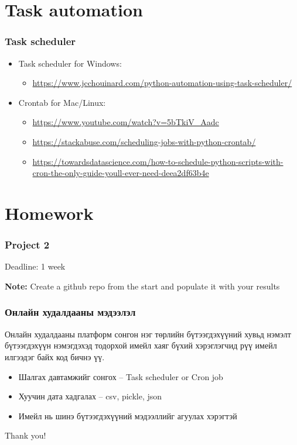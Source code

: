 \documentclass{beamer}
\begin{document}
\section{Task automation} 

\begin{frame}
    \frametitle{Task scheduler}
        \begin{itemize}
            \item Task scheduler for Windows:
            \begin{itemize}
                \item \url{https://www.jcchouinard.com/python-automation-using-task-scheduler/}
            \end{itemize}
            
            
            \item Crontab for Mac/Linux:
            \begin{itemize}
                \item \url{https://www.youtube.com/watch?v=5bTkiV_Aadc}
                \item \url{https://stackabuse.com/scheduling-jobs-with-python-crontab/}
                \item \url{https://towardsdatascience.com/how-to-schedule-python-scripts-with-cron-the-only-guide-youll-ever-need-deea2df63b4e}
            \end{itemize}
        \end{itemize}
\end{frame}


\section{Homework} 

\begin{frame}
    \frametitle{Project 2}
\vskip 2mm
Deadline: 1 week %

\vfill
\textbf{Note:} Create a github repo from the start and populate it with your results
\end{frame}

\begin{frame}
    \frametitle{Онлайн худалдааны мэдээлэл}
    Онлайн худалдааны платформ сонгон нэг төрлийн бүтээгдэхүүний хувьд нэмэлт бүтээгдэхүүн нэмэгдэхэд тодорхой имейл хаяг бүхий хэрэглэгчид рүү имейл илгээдэг байх код бичнэ үү. 

    \begin{itemize}
        \item Шалгах давтамжийг сонгох – Task scheduler or Cron job
        \item Хуучин дата хадгалах – csv, pickle, json
        \item Имейл нь шинэ бүтээгдэхүүний мэдээллийг агуулах хэрэгтэй
    \end{itemize}
\end{frame}

\begin{frame}
\Huge{\centerline{Thank you!}}
\end{frame}

\end{document}
